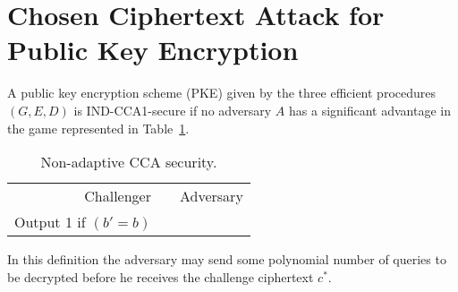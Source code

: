 \iffalse
    \section{Chosen Ciphertext Attack for Public Key Encryption}


    \begin{definition}
        A public key encryption scheme (PKE) given by the three efficient procedures $(G,E,D)$ is
        IND-CCA1-secure if no adversary $A$ has a significant advantage in the game
        represented in Table~\ref{tab:cca1}.
        \begin{table}[ht]
            \centering
            \begin{tabular}{r c l}
                Challenger           &  & Adversary \\
                Output 1 if $(b'=b)$ &  &           \\
            \end{tabular}
            \caption{Non-adaptive CCA security.}\label{tab:cca1}
        \end{table}

        In this definition the adversary may send some polynomial number of queries
        to be decrypted before he receives the challenge ciphertext $c^*$.
    \end{definition}



